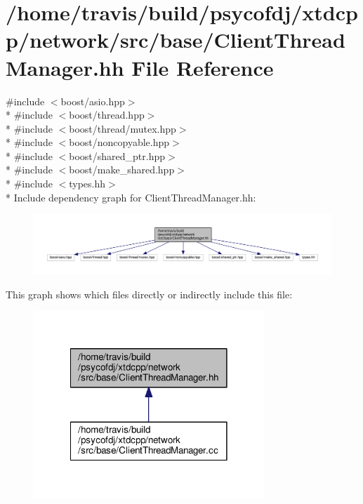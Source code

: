 \hypertarget{ClientThreadManager_8hh}{\section{/home/travis/build/psycofdj/xtdcpp/network/src/base/\-Client\-Thread\-Manager.hh File Reference}
\label{ClientThreadManager_8hh}
}
{\ttfamily \#include $<$boost/asio.\-hpp$>$}\\*
{\ttfamily \#include $<$boost/thread.\-hpp$>$}\\*
{\ttfamily \#include $<$boost/thread/mutex.\-hpp$>$}\\*
{\ttfamily \#include $<$boost/noncopyable.\-hpp$>$}\\*
{\ttfamily \#include $<$boost/shared\-\_\-ptr.\-hpp$>$}\\*
{\ttfamily \#include $<$boost/make\-\_\-shared.\-hpp$>$}\\*
{\ttfamily \#include $<$types.\-hh$>$}\\*
Include dependency graph for Client\-Thread\-Manager.\-hh\-:
\nopagebreak
\begin{figure}[H]
\begin{center}
\leavevmode
\includegraphics[width=350pt]{ClientThreadManager_8hh__incl}
\end{center}
\end{figure}
This graph shows which files directly or indirectly include this file\-:
\nopagebreak
\begin{figure}[H]
\begin{center}
\leavevmode
\includegraphics[width=246pt]{ClientThreadManager_8hh__dep__incl}
\end{center}
\end{figure}
